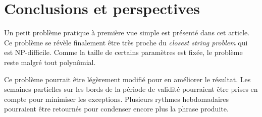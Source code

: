 \documentclass{roadef}
\begin{document}
\section{Conclusions et perspectives}

Un petit problème pratique à première vue simple est présenté dans cet
article. Ce problème se révèle finalement être très proche du
\emph{closest string problem} qui est NP-difficile. Comme la taille de
certains paramètres est fixée, le problème reste malgré tout
polynômial.

Ce problème pourrait être légèrement modifié pour en améliorer le
résultat. Les semaines partielles sur les bords de la période de
validité pourraient être prises en compte pour minimiser les
exceptions. Plusieurs rythmes hebdomadaires pourraient être retournés
pour condenser encore plus la phrase produite.



\end{document}
